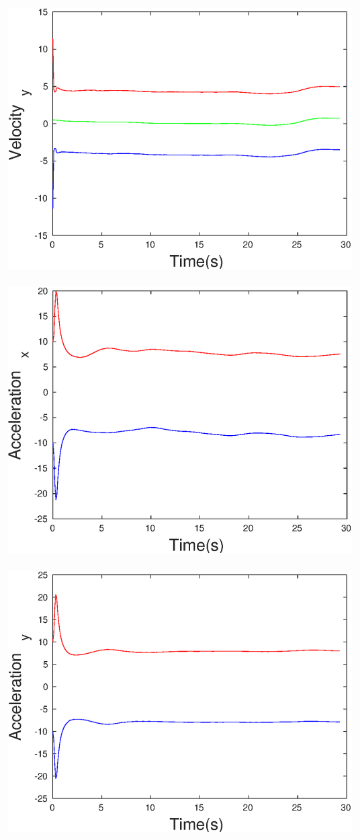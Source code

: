 \begin{figure}[h]
\begin{subfigure}{.5\linewidth}
\end{subfigure}
\begin{subfigure}{.5\linewidth}
\centering
\includegraphics[width=.9\linewidth]{figures/Frad/s3caSMVelocity_y}
\end{subfigure}
\begin{subfigure}{.5\linewidth}
\centering
\includegraphics[width=.9\linewidth]{figures/Frad/s3caSMAcceleration_x}
\end{subfigure}
\begin{subfigure}{.5\linewidth}
\centering
\includegraphics[width=.9\linewidth]{figures/Frad/s3caSMAcceleration_y}

\end{subfigure}
\end{figure}
